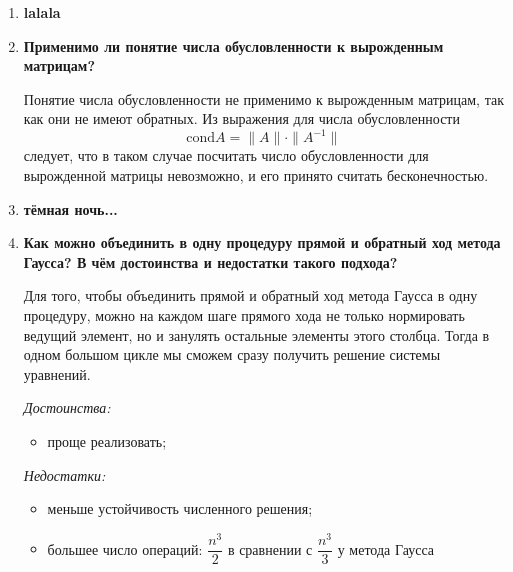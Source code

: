 \documentclass[12pt, a4paper]{article}
\begin{document}
\begin{enumerate}
		\item \textbf{lalala}
		
		\item \textbf{Применимо ли понятие числа обусловленности к вырожденным матрицам?}
		
		Понятие числа обусловленности не применимо к вырожденным матрицам, так как они не имеют обратных. Из выражения для числа обусловленности $$\text{cond} A=\|A\|\cdot\|A^{-1}\|$$ следует, что в таком случае посчитать число обусловленности для вырожденной матрицы невозможно, и его принято считать бесконечностью.
		
		\item \textbf{тёмная ночь...}
		
		\item \textbf{Как можно объединить в одну процедуру прямой и обратный ход метода Гаусса? В чём достоинства и недостатки такого подхода?}
		
		Для того, чтобы объединить прямой и обратный ход метода Гаусса в одну процедуру, можно на каждом шаге прямого хода не только нормировать ведущий элемент, но и занулять остальные элементы этого столбца. Тогда в одном большом цикле мы сможем сразу получить решение системы уравнений.
		
		\textit{Достоинства:}
		\begin{itemize}
			\item проще реализовать;
		\end{itemize}
		
		\textit{Недостатки:}
		\begin{itemize}
			\item меньше устойчивость численного решения;
			\item большее число операций: $\dfrac{n^3}{2}$ в сравнении с $\dfrac{n^3}{3}$ у метода Гаусса
		\end{itemize}
		
	\end{enumerate}
	
\end{document}
